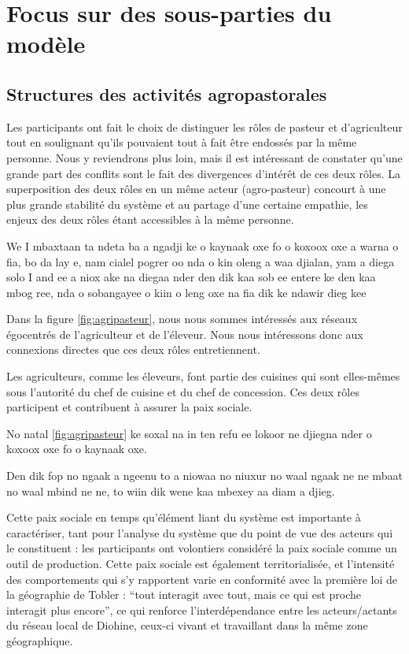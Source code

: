 \chapter{Focus sur des sous-parties du modèle}

\section{Structures des activités agropastorales}

\begin{paracol}{2}
Les participants ont fait le choix de distinguer les rôles de pasteur et d'agriculteur tout en soulignant qu'ils pouvaient tout à fait être endossés par la même personne. Nous y reviendrons plus loin, mais il est intéressant de constater qu'une grande part des conflits sont le fait des divergences d'intérêt de ces deux rôles. La superposition des deux rôles en un même acteur (agro-pasteur) concourt à une plus grande stabilité du système et au partage d'une certaine empathie, les enjeux des deux rôles étant accessibles à la même personne.

\switchcolumn %

We I mbaxtaan ta ndeta ba a ngadji ke o kaynaak oxe fo o koxoox oxe a warna o fia, bo da lay e, nam cialel pogrer oo nda o kin oleng a waa djialan, yam a diega solo I and ee a niox ake na diegaa nder den dik kaa sob ee entere ke den kaa mbog ree, nda o sobangayee o kiin o leng oxe na fia dik ke ndawir dieg kee

\switchcolumn %

Dans la figure \ref{fig:agripasteur}, nous nous sommes intéressés aux réseaux égocentrés de l'agriculteur et de l'éleveur. Nous nous intéressons donc aux connexions directes que ces deux rôles entretiennent.

Les agriculteurs, comme les éleveurs, font partie des cuisines qui sont elles-mêmes sous l'autorité du chef de cuisine et du chef de concession. Ces deux rôles participent et contribuent à assurer la paix sociale.

\switchcolumn %

No natal \ref{fig:agripasteur} ke soxal na in ten refu ee lokoor ne djiegna nder o koxoox oxe fo o kaynaak oxe.

Den dik fop no ngaak a ngeenu to a niowaa no niuxur no waal ngaak ne ne mbaat no waal mbind ne ne, to wiin dik wene kaa mbexey aa diam a djieg.

\switchcolumn %

Cette paix sociale en temps qu'élément liant du système est importante à caractériser, tant pour l'analyse du système que du point de vue des acteurs qui le constituent : les participants ont volontiers considéré la paix sociale comme un outil de production. Cette paix sociale est également territorialisée, et l'intensité des comportements qui s'y rapportent varie en conformité avec la première loi de la géographie de Tobler : “tout interagit avec tout, mais ce qui est proche interagit plus encore”, ce qui renforce l'interdépendance entre les acteurs/actants du réseau local de Diohine, ceux-ci vivant et travaillant dans la même zone géographique.


\end{paracol}

